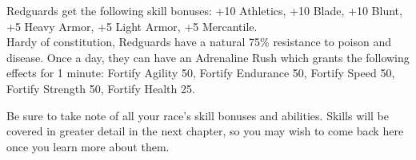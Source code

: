 Redguards get the following skill bonuses: +10 Athletics, +10 Blade, +10 Blunt, +5 Heavy Armor, +5 Light Armor, +5 Mercantile.\\

Hardy of constitution, Redguards have a natural 75\% resistance to poison and disease. Once a day, they can have an Adrenaline Rush which grants the following effects for 1 minute: Fortify Agility 50, Fortify Endurance 50, Fortify Speed 50, Fortify Strength 50, Fortify Health 25.\\

\begin{tcolorbox}
Be sure to take note of all your race's skill bonuses and abilities. Skills will be covered in greater detail in the next chapter, so you may wish to come back here once you learn more about them.
\end{tcolorbox}